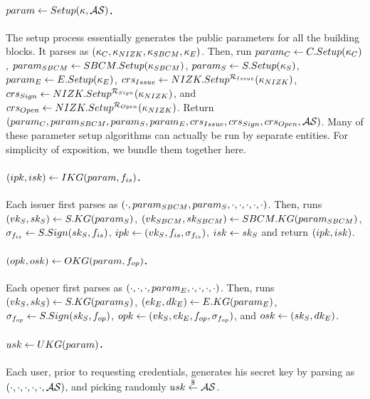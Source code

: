 \paragraph{$param \gets Setup(\kappa,\mathcal{AS})$.} %
The setup process essentially generates the public parameters for all the
building blocks. It parses \secpar as $(\kappa_{C},\kappa_{NIZK},\kappa_{SBCM},
\kappa_{E})$. Then, run $param_C \gets
C.Setup(\kappa_{C})$, $param_{SBCM} \gets  SBCM.Setup(\kappa_{SBCM})$, $param_{S} \gets
S.Setup(\kappa_{S})$, $param_{E} \gets E.Setup(\kappa_{E})$, $crs_{Issue} \gets
NIZK.Setup^{\mathcal{R}_{Issue}}(\kappa_{NIZK})$, $crs_{Sign} \gets
NIZK.Setup^{\mathcal{R}_{Sign}}(\kappa_{NIZK})$, and $crs_{Open} \gets
NIZK.Setup^{\mathcal{R}_{Open}}(\kappa_{NIZK})$. Return $(param_C,param_{SBCM},
param_{S},param_{E},crs_{Issue},crs_{Sign},crs_{Open},
\mathcal{AS})$. Many of these parameter setup algorithms can
actually be run by separate entities. For simplicity of exposition, we bundle
them together here.

\paragraph{$(ipk,isk) \gets IKG(param,f_{is})$.} %
Each issuer first parses \parm as $(\cdot,param_{SBCM},
param_{S},\cdot,\cdot,\cdot,\cdot,\cdot)$. Then, runs $(vk_{S},sk_{S}) \gets
S.KG(param_{S})$, $(vk_{SBCM},sk_{SBCM}) \gets SBCM.KG(param_{SBCM})$,
$\sigma_{f_{is}} \gets S.Sign(sk_{S},f_{is})$, $ipk \gets (vk_{S},f_{is},
\sigma_{f_{is}})$, $isk \gets sk_{S}$ and return $(ipk,isk)$.

\paragraph{$(opk,osk) \gets OKG(param,f_{op})$.} %
Each opener first parses \parm as $(\cdot,\cdot,
\cdot,param_{E},\cdot,\cdot,\cdot,\cdot)$. Then, runs $(vk_{S},sk_{S}) \gets S.KG
(param_{S})$, $(ek_{E},dk_{E}) \gets E.KG(param_{E})$, $\sigma_{f_{op}} \gets S.Sign
(sk_{S},f_{op})$, $opk \gets (vk_{S},ek_{E},f_{op},\sigma_{f_{op}})$, and $osk \gets
(sk_{S},dk_{E})$.

\paragraph{$usk \gets UKG(param)$.} %
Each user, prior to requesting credentials, generates his secret key by parsing
\parm as $(\cdot,\cdot,\cdot,\cdot,\cdot,\mathcal{AS})$, and picking randomly
$usk \stackrel{\$}{\gets} \mathcal{AS}$.


